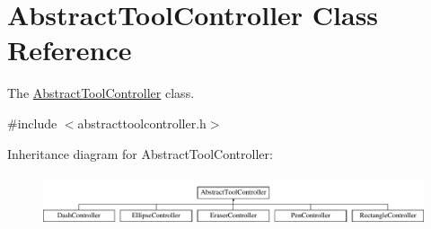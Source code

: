 \hypertarget{classAbstractToolController}{}\section{Abstract\+Tool\+Controller Class Reference}
\label{classAbstractToolController}


The \hyperlink{classAbstractToolController}{Abstract\+Tool\+Controller} class.  




{\ttfamily \#include $<$abstracttoolcontroller.\+h$>$}

Inheritance diagram for Abstract\+Tool\+Controller\+:\begin{figure}[H]
\begin{center}
\leavevmode
\includegraphics[height=1.523810cm]{classAbstractToolController}
\end{center}
\end{figure}
